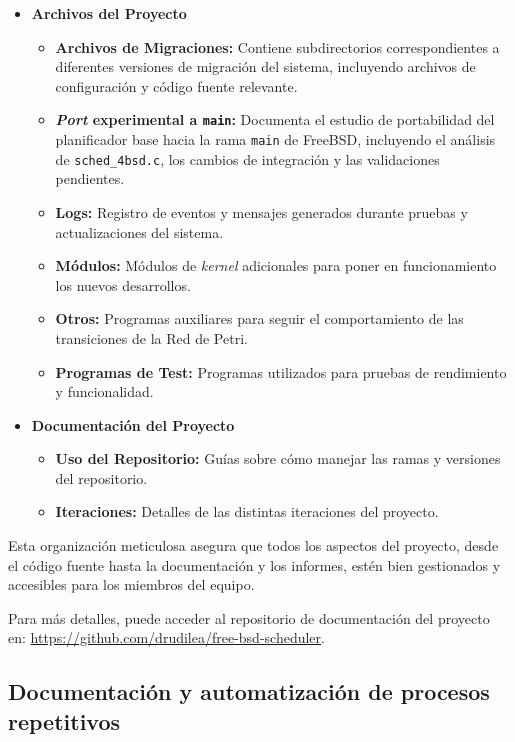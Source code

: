 \begin{itemize}
    \item \textbf{Archivos del Proyecto}
          \begin{itemize}
              \item \textbf{Archivos de Migraciones:} Contiene subdirectorios correspondientes a diferentes versiones de migración del sistema, incluyendo archivos de configuración y código fuente relevante.
              \item \textbf{\textit{Port} experimental a \texttt{main}:} Documenta el estudio de portabilidad del planificador base hacia la rama \texttt{main} de FreeBSD, incluyendo el análisis de \verb|sched_4bsd.c|, los cambios de integración y las validaciones pendientes.
              \item \textbf{Logs:} Registro de eventos y mensajes generados durante pruebas y actualizaciones del sistema.
              \item \textbf{Módulos:} Módulos de \textit{kernel} adicionales para poner en funcionamiento los nuevos desarrollos.
              \item \textbf{Otros:} Programas auxiliares para seguir el comportamiento de las transiciones de la Red de Petri.
              \item \textbf{Programas de Test:} Programas utilizados para pruebas de rendimiento y funcionalidad.
          \end{itemize}
    \item \textbf{Documentación del Proyecto}
          \begin{itemize}
              \item \textbf{Uso del Repositorio:} Guías sobre cómo manejar las ramas y versiones del repositorio.
              \item \textbf{Iteraciones:} Detalles de las distintas iteraciones del proyecto.
          \end{itemize}
\end{itemize}

Esta organización meticulosa asegura que todos los aspectos del proyecto, desde el código fuente hasta la documentación y los informes, estén bien gestionados y accesibles para los miembros del equipo.\par

Para más detalles, puede acceder al repositorio de documentación del proyecto en: \url{https://github.com/drudilea/free-bsd-scheduler}.\par

\subsection{Documentación y automatización de procesos repetitivos}


